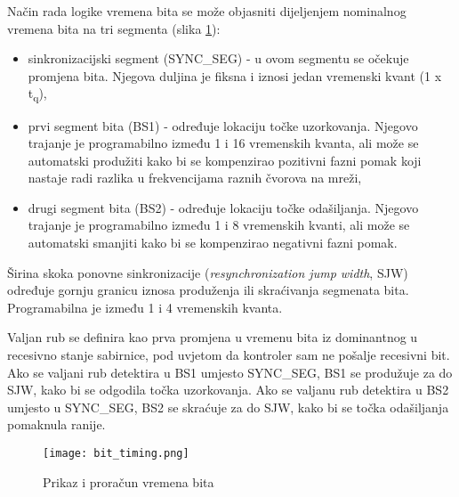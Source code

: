Način rada logike vremena bita se može objasniti dijeljenjem nominalnog vremena bita na tri segmenta (slika \ref{fig:bit_timing}):
\begin{itemize}
	\item sinkronizacijski segment (SYNC\_SEG) - u ovom segmentu se očekuje promjena bita. Njegova duljina je fiksna i iznosi jedan vremenski kvant (1 x t\textsubscript{q}),
	\item prvi segment bita (BS1) - određuje lokaciju točke uzorkovanja. Njegovo trajanje je programabilno između 1 i 16 vremenskih kvanta, ali može se automatski produžiti kako bi se kompenzirao pozitivni fazni pomak koji nastaje radi razlika u frekvencijama raznih čvorova na mreži,
	\item drugi segment bita (BS2) - određuje lokaciju točke odašiljanja. Njegovo trajanje je programabilno između 1 i 8 vremenskih kvanti, ali može se automatski smanjiti kako bi se kompenzirao negativni fazni pomak.
\end{itemize}

Širina skoka ponovne sinkronizacije (\textit{resynchronization jump width}, SJW) određuje gornju granicu iznosa produženja ili skraćivanja segmenata bita. Programabilna je između 1 i 4 vremenskih kvanta.

Valjan rub se definira kao prva promjena u vremenu bita iz dominantnog u recesivno stanje sabirnice, pod uvjetom da kontroler sam ne pošalje recesivni bit. Ako se valjani rub detektira u BS1 umjesto SYNC\_SEG, BS1 se produžuje za do SJW, kako bi se odgodila točka uzorkovanja. Ako se valjanu rub detektira u BS2 umjesto u SYNC\_SEG, BS2 se skraćuje za do SJW, kako bi se točka odašiljanja pomaknula ranije.

\begin{figure}[H]
	\centering
	\texttt{[image: bit\_timing.png]}
	\caption{Prikaz i proračun vremena bita \cite[str. 1645]{l471_manual}}
	\label{fig:bit_timing}
\end{figure}

